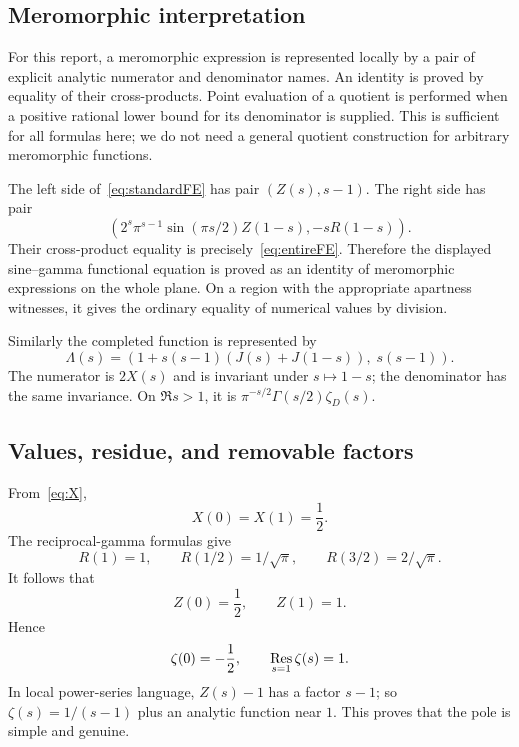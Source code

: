 \documentclass[11pt,letterpaper]{article}
\numberwithin{equation}{section}
\theoremstyle{definition}
\newcommand{\gamrec}{R}
\begin{document}
\subsection{Meromorphic interpretation}

For this report, a meromorphic expression is represented locally by a
pair of explicit analytic numerator and denominator names. An identity
is proved by equality of their cross-products. Point evaluation of a
quotient is performed when a positive rational lower bound for its
denominator is supplied. This is sufficient for all formulas here;
we do not need a general quotient construction for arbitrary meromorphic
functions.

The left side of~\eqref{eq:standardFE} has pair
\((Z(s),s-1)\).
The right side has pair
\[
 \left(2^s\pi^{s-1}\sin(\pi s/2)Z(1-s),
                              -s\gamrec(1-s)\right).
\]
Their cross-product equality is precisely~\eqref{eq:entireFE}.
Therefore the displayed sine--gamma functional equation is proved
as an identity of meromorphic expressions on the whole plane.
On a region with the appropriate apartness witnesses, it gives
the ordinary equality of numerical values by division.

Similarly the completed function is represented by
\begin{equation}
 \Lambda(s)=
  \left(1+s(s-1)(J(s)+J(1-s)),\;s(s-1)\right).
 \label{eq:Lambda}
\end{equation}
The numerator is \(2X(s)\) and is invariant under \(s\mapsto1-s\);
the denominator has the same invariance.
On \(\Re s>1\), it is
\(\pi^{-s/2}\Gamma(s/2)\zeta_D(s)\).

\subsection{Values, residue, and removable factors}

From~\eqref{eq:X},
\[
 X(0)=X(1)=\frac12.
\]
The reciprocal-gamma formulas give
\[
 \gamrec(1)=1,\qquad
 \gamrec(1/2)=1/\sqrt\pi,\qquad
 \gamrec(3/2)=2/\sqrt\pi.
\]
It follows that
\[
 Z(0)=\frac12,\qquad Z(1)=1.
\]
Hence
\begin{equation}
 \zeta(0)=-\frac12,\qquad
                  \mathop{\rm Res}_{s=1}\zeta(s)=1.       \label{eq:specialvalues}
\end{equation}
In local power-series language, \(Z(s)-1\) has a factor \(s-1\);
so \(\zeta(s)=1/(s-1)\) plus an analytic function near \(1\).
This proves that the pole is simple and genuine.
\end{document}
